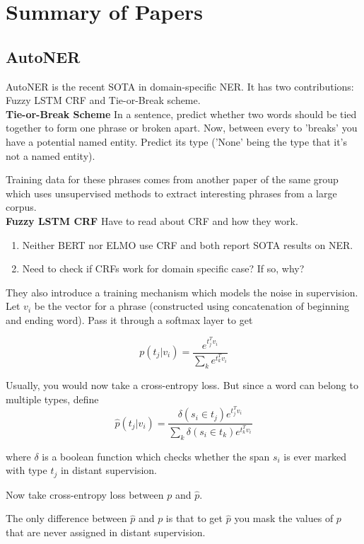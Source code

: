 \section{Summary of Papers}
\label{sec:summary}

\subsection{AutoNER}
AutoNER \cite{autoner} is the recent SOTA in domain-specific NER. It has two contributions: Fuzzy LSTM CRF and Tie-or-Break scheme.
\\

\noindent\textbf{Tie-or-Break Scheme}
In a sentence, predict whether two words should be tied together to form one phrase or broken apart. Now, between every to 'breaks' you have a potential named entity. Predict its type ('None' being the type that it's not a named entity).

Training data for these phrases comes from another paper of the same group \cite{autophrase} which uses unsupervised methods to extract interesting phrases from a large corpus.
\\

\noindent\textbf{Fuzzy LSTM CRF}
Have to read about CRF and how they work. 
\begin{enumerate}
	\item Neither BERT nor ELMO use CRF and both report SOTA results on NER.
	\item Need to check if CRFs work for domain specific case? If so, why?
\end{enumerate}

They also introduce a training mechanism which models the noise in supervision.
Let $v_i$ be the vector for a phrase (constructed using concatenation of beginning and ending word). Pass it through a softmax layer to get 

\[
	p(t_j|v_i) = \frac{e^{t_j^Tv_i}}{\sum_{k}{e^{t_k^Tv_i}}}
\]

Usually, you would now take a cross-entropy loss. But since a word can belong to multiple types, define
\[
	\hat{p}(t_j|v_i) = \frac{\delta(s_i \in t_j) e^{t_j^Tv_i}}{\sum_{k}{\delta(s_i \in t_k)e^{t_k^Tv_i}}}
\]

where $\delta$ is a boolean function which checks whether the span $s_i$ is ever marked with type $t_j$ in distant supervision.

Now take cross-entropy loss between $p$ and $\hat{p}$.

The only difference between $\hat{p}$ and $p$ is that to get $\hat{p}$ you mask the values of $p$ that are never assigned in distant supervision. 


